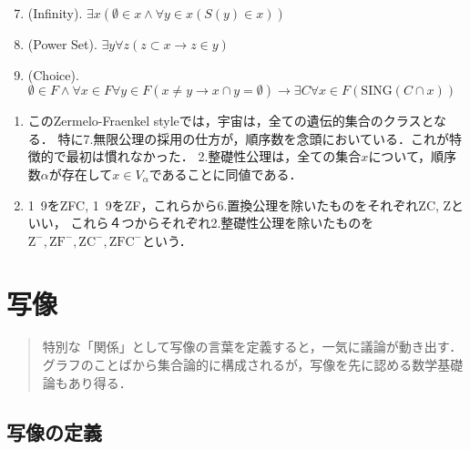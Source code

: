 \documentclass[uplatex, 12pt, dvipdfmx]{jsreport}
\begin{document}
\begin{shadebox}
\begin{definition}[集合の公理系ZF]
\begin{screen}
\begin{notation}
            \end{notation}
        \end{screen}
        \begin{enumerate}\setcounter{enumi}{6}
            \item (Infinity). $\exists x(\emptyset\in x\land \forall y\in x(S(y)\in x))$
            \item (Power Set). $\exists y\forall z(z\subset x\rightarrow z\in y)$
            \item (Choice). $\emptyset\in F\land\forall x\in F\forall y\in F(x\ne y\rightarrow x\cap y=\emptyset)\rightarrow \exists C\forall x\in F(\mathrm{SING}(C\cap x))$
        \end{enumerate}
    \end{definition}
\end{shadebox}
\begin{remark}\mbox{}
    \begin{enumerate}
        \item このZermelo-Fraenkel styleでは，宇宙は，全ての遺伝的集合のクラスとなる．
        特に7.無限公理の採用の仕方が，順序数を念頭においている．これが特徴的で最初は慣れなかった．
        2.整礎性公理は，全ての集合$x$について，順序数$\alpha$が存在して$x\in V_\alpha$であることに同値である．
        \item 1~9をZFC, 1~9をZF，これらから6.置換公理を除いたものをそれぞれZC, Zといい，
        これら４つからそれぞれ2.整礎性公理を除いたものを$\mathrm{Z^-,ZF^-,ZC^-,ZFC^-}$という．
    \end{enumerate} 
\end{remark}


\chapter{写像}

\begin{quotation}
    特別な「関係」として写像の言葉を定義すると，一気に議論が動き出す．
    グラフのことばから集合論的に構成されるが，写像を先に認める数学基礎論もあり得る．
\end{quotation}

\section{写像の定義}
\end{document}
